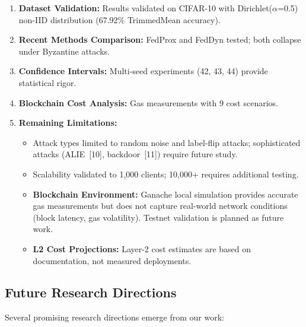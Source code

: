 \documentclass[12pt,a4paper,onecolumn]{article}
\begin{document}
\begin{enumerate}
    \item \textbf{Dataset Validation:} Results validated on CIFAR-10 with Dirichlet($\alpha$=0.5) non-IID distribution (67.92\% TrimmedMean accuracy).
    
    \item \textbf{Recent Methods Comparison:} FedProx and FedDyn tested; both collapse under Byzantine attacks.
    
    \item \textbf{Confidence Intervals:} Multi-seed experiments (42, 43, 44) provide statistical rigor.
    
    \item \textbf{Blockchain Cost Analysis:} Gas measurements with 9 cost scenarios.
    
    \item \textbf{Remaining Limitations:}
    \begin{itemize}
        \item Attack types limited to random noise and label-flip attacks; sophisticated attacks (ALIE~[10], backdoor~[11]) require future study.
        \item Scalability validated to 1,000 clients; 10,000+ requires additional testing.
        \item \textbf{Blockchain Environment:} Ganache local simulation provides accurate gas measurements but does not capture real-world network conditions (block latency, gas volatility). Testnet validation is planned as future work.
        \item \textbf{L2 Cost Projections:} Layer-2 cost estimates are based on documentation, not measured deployments.
    \end{itemize}
\end{enumerate}

\subsection{Future Research Directions}

Several promising research directions emerge from our work:
\end{document}
